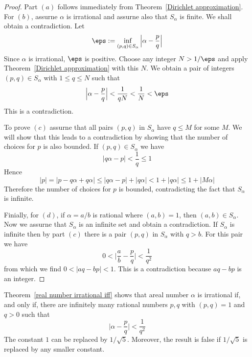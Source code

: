 \begin{proof}
Part $(a)$ follows immediately from Theorem~\ref{Dirichlet approximation}. For $(b)$, assurne $\alpha$ is irrational and assurne also that $S_\alpha$ is finite. We shall obtain a contradiction. Let
\[\eps:=\inf_{(p,q)\in S_\alpha}\Big|\alpha-\frac{p}{q}\Big|\]
Since $\alpha$ is irrational, $\eps$ is positive. Choose any integer $N>1/\eps$ and apply Theorem~\ref{Dirichlet approximation} with this $N$. We obtain a pair of integers $(p,q)\in S_\alpha$ with $1\leq q\leq N$ such that
\[\Big|\alpha-\frac{p}{q}\Big|<\frac{1}{qN}<\frac{1}{N}<\eps\]
This is a contradiction.\par
To prove $(c)$ assurne that all pairs $(p,q)$ in $S_\alpha$ have $q\leq M$ for some $M$. We will show that this leads to a contradiction by showing that the number
of choices for $p$ is also bounded. If $(p,q)\in S_\alpha$ we have
\[|q\alpha-p|<\frac{1}{q}\leq 1\]
Hence
\[|p|=|p-q\alpha+q\alpha|\leq|q\alpha-p|+|q\alpha|<1+|q\alpha|\leq 1+|M\alpha|\]
Therefore the number of choices for $p$ is bounded, contradicting the fact that $S_\alpha$ is infinite.\par
Finially, for $(d)$, if $\alpha=a/b$ is rational where $(a,b)=1$, then $(a,b)\in S_\alpha$. Now we assurne that $S_\alpha$ is an infinite set and obtain a contradiction. If $S_\alpha$ is infinite then by part $(c)$ there is a pair $(p,q)$ in $S_\alpha$ with $q>b$. For this pair we have
\[0<\Big|\frac{a}{b}-\frac{p}{q}\Big|<\frac{1}{q^2}\]
from which we find $0<|aq-bp|<1$. This is a contradiction because $aq-bp$ is an integer.
\end{proof}
\begin{remark}
Theorem~\ref{real number irrational iff} shows that areal number $\alpha$ is irrational if, and only if, there are infinitely many rational numbers $p,q$ with $(p,q)=1$ and $q>0$ such that
\[\Big|\alpha-\frac{p}{q}\Big|<\frac{1}{q^2}\]
The constant $1$ can be replaced by $1/\sqrt{5}$. Moreover, the result is false if $1/\sqrt{5}$ is replaced by any smaller constant.
\end{remark}
